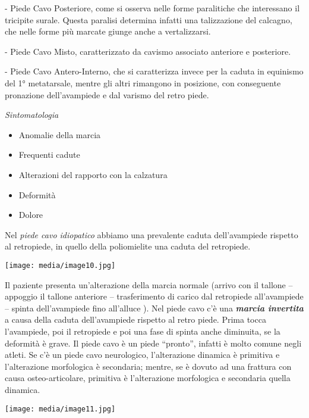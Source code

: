 \documentclass[]{article}
\begin{document}
- Piede Cavo Posteriore, come si osserva nelle forme paralitiche che
interessano il tricipite surale. Questa paralisi determina infatti una
talizzazione del calcagno, che nelle forme più marcate giunge anche a
vertalizzarsi.

- Piede Cavo Misto, caratterizzato da cavismo associato anteriore e
posteriore.

- Piede Cavo Antero-Interno, che si caratterizza invece per la caduta in
equinismo del 1° metatarsale, mentre gli altri rimangono in posizione,
con conseguente pronazione dell'avampiede e dal varismo del retro piede.

\emph{Sintomatologia}

\begin{itemize}
\item
  Anomalie della marcia
\item
  Frequenti cadute
\item
  Alterazioni del rapporto con la calzatura
\item
  Deformità
\item
  Dolore
\end{itemize}

Nel \emph{piede cavo idiopatico} abbiamo una prevalente caduta
dell'avampiede rispetto al retropiede, in quello della poliomielite una
caduta del retropiede.

\texttt{[image: media/image10.jpg]}

Il paziente presenta un'alterazione della marcia normale (arrivo con il
tallone -- appoggio il tallone anteriore -- trasferimento di carico dal
retropiede all'avampiede -- spinta dell'avampiede fino all'alluce ). Nel
piede cavo c'è una \textbf{\emph{marcia invertita}} a causa della caduta
dell'avampiede rispetto al retro piede. Prima tocca l'avampiede, poi il
retropiede e poi una fase di spinta anche diminuita, se la deformità è
grave. Il piede cavo è un piede ``pronto'', infatti è molto comune negli
atleti. Se c'è un piede cavo neurologico, l'alterazione dinamica è
primitiva e l'alterazione morfologica è secondaria; mentre, se è dovuto
ad una frattura con causa osteo-articolare, primitiva è l'alterazione
morfologica e secondaria quella dinamica.

\texttt{[image: media/image11.jpg]}
\end{document}
